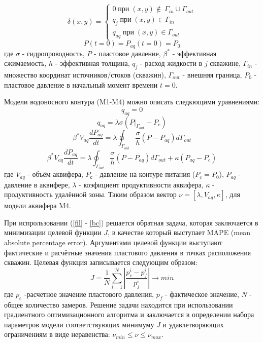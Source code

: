 \documentclass{article}
\begin{document}
\begin{equation} \label{bc}
\delta(x,y)  = \left\{\begin{array}{crl}
0\;при\;(x,y) \notin\ \Gamma_{in}\cup\Gamma_{out}\\
q_j\;при\;(x,y) \in \Gamma_{in}\\
q_{aq}\;при\;(x,y) \in \Gamma_{out}
\end{array}\right.
\end{equation}
\begin{equation*}
P(t=0) = P_{aq}(t=0) = P_0
\end{equation*}
где $\sigma$ - гидропроводность, $P$ - пластовое давление, $\beta^*$ - эффективная сжимаемость, $h$ - эффективная толщина, $q_j$ - расход жидкости в $j$ скважине, $\Gamma_{in}$ - множество координат источников/стоков (скважин), $\Gamma_{out}$ - внешняя граница, $P_0$ - пластовое давление в начальный момент времени $t=0$.

Модели водоносного контура (M1-M4) можно описать следкющими уравнениями:
\begin{equation}
q_{aq}=0
\end{equation}
\begin{equation}
q_{aq} = \lambda\sigma(P|_{\Gamma_{out}}-P_c)
\end{equation}
\begin{equation}
\beta^*V_{aq}\frac{dP_{aq}}{dt} = \lambda\oint_{\Gamma_{out}}\frac{\sigma}{h}(P-P_{aq})d\Gamma_{out}
\end{equation}
\begin{equation}
\beta^*V_{aq}\frac{dP_{aq}}{dt} =\lambda\oint_{\Gamma_{out}}\frac{\sigma}{h}(P-P_{aq})d\Gamma_{out} + \kappa(P_{aq}-P_c)
\end{equation}
где $V_{aq}$ - объём аквифера, $P_с$ - давление на контуре питания ($P_c = P_0$), $P_{aq}$ - давление в аквифере, $\lambda$ - коэфициент продуктивности аквифера, $\kappa$ - продуктивность удалённой зоны. Таким образом вектор $\nu = [\lambda, V_{aq}, \kappa]$, для модели аквифера M4.

При испрользовании (\ref{fil} - \ref{bc}) решается обратная задача, которая заключается в  минимизации целевой функции $J$, в качестве который выступает MAPE (mean absolute percentage error). Аргументами целевой функции выступают фактические и расчётные значения пластового давления в точках расположения скважин. Целевая функция записывается следующим образом:
\begin{equation} \label{mape}
J=\frac{1}{N}\sum_{i=1}^N{\left\vert\frac{p_c^i-p_f^i}{p_f^i}\right\vert}\rightarrow min
\end{equation}
где $p_c$ -расчетное значение пластового давления, $p_f$ - фактическое значение, $N$ - общее количество замеров. Решение задачи находится при использовании градиентного оптимизационного алгоритма и заключается в определении набора параметров модели соответствующих минимуму $J$ и удавлетворяющих ограничениям в виде неравенства: $\nu_{min}\leq\nu\leq\nu_{max}$.
\end{document}
